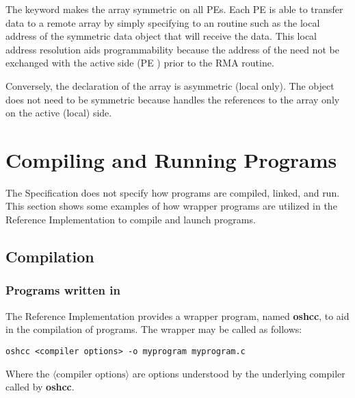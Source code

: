 The  keyword makes the  array symmetric on all \acp{PE}.
Each \ac{PE} is able to transfer data to a remote \dest{} array by simply
specifying to an \openshmem routine such as \hyperref[subsec:shmem_put]{}
the local address of the symmetric data object that will receive the data.
This local address resolution aids programmability because the address of the
\dest{} need not be exchanged with the active side (\ac{PE} ) prior to
the \acf{RMA} routine.

Conversely, the declaration of the  array is asymmetric
(local only).
The \source{} object does not need to be symmetric because \PUT{} handles the
references to the  array only on the active (local) side.



\chapter{Compiling and Running Programs}\label{sec:compiling}
The \openshmem Specification does not specify how
\openshmem programs are compiled, linked, and run. This section shows some
examples of how wrapper programs are utilized in the \openshmem Reference
Implementation to compile and launch programs.

\section{Compilation}
\subsection*{Programs written in \Cstd}

The \openshmem Reference Implementation provides a wrapper program, named
\textbf{oshcc}, to aid in the compilation of \Cstd programs.
The wrapper may be called as follows:

\begin{lstlisting}[]
oshcc <compiler options> -o myprogram myprogram.c
\end{lstlisting}
Where the $\langle\mbox{compiler options}\rangle$ are options understood by the
underlying \Cstd compiler called by \textbf{oshcc}.


